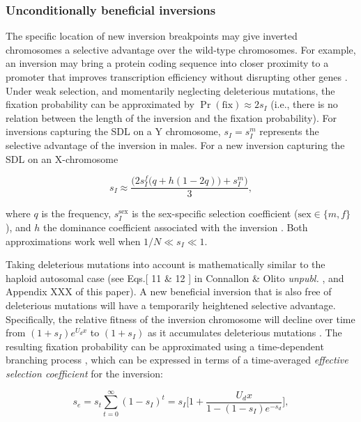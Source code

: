 \documentclass{article}
\newcommand\hl[1]{%
  \bgroup
  \hskip0pt\color{blue!80!black}%
  #1%
  \egroup
}
\begin{document}
\subsubsection*{Unconditionally beneficial inversions}

The specific location of new inversion breakpoints may give inverted chromosomes a selective advantage over the wild-type chromosomes. For example, an inversion may bring a protein coding sequence into closer proximity to a promoter that improves transcription efficiency without disrupting other genes \citep{KrimbasPowell1992}. Under weak selection, and momentarily neglecting deleterious mutations, the fixation probability can be approximated by $\Pr(\text{fix}) \approx 2 s_{I}$ \citep{Haldane1927} (i.e., there is no relation between the length of the inversion and the fixation probability). For inversions capturing the SDL on a Y chromosome, $s_I = s_{I}^{m}$ represents the selective advantage of the inversion in males. For a new inversion capturing the SDL on an X-chromosome

\begin{equation} \label{eq:benXlinkednoDel}
	s_{I} \approx \frac{\big( 2 s_{I}^{f} \big(q + h (1 - 2q) \big) + s_{I}^{m} \big)}{3},
\end{equation}

\noindent where $q$ is the frequency, $s_{I}^{\text{sex}}$ is the sex-specific selection coefficient ($\text{sex} \in \{m,f\}$), and $h$ the dominance coefficient associated with the inversion \citep{Charlesworth2010}. Both approximations work well when $1/N \ll s_I \ll 1.$

Taking deleterious mutations into account is mathematically similar to the haploid autosomal case (see Eqs.[\hl{11 \& 12}] in \hl{Connallon \& Olito {\itshape unpubl.}}, and Appendix \hl{XXX} of this paper). A new beneficial inversion that is also free of deleterious mutations will have a temporarily heightened selective advantage. Specifically, the relative fitness of the inversion chromosome will decline over time from $(1 + s_I)e^{U_d x}$ to $(1 + s_I)$ as it accumulates deleterious mutations \citep{Nei1967}. The resulting fixation probability can be approximated using a time-dependent branching process \citep{PeischlKirkpatrick2012, KirkpatrickPeischl2013}, which can be expressed in terms of a time-averaged {\itshape effective selection coefficient} for the inversion:

\begin{equation} \label{eq:benSe}
	s_{e} = s_t \sum_{t=0}^{\infty} (1 - s_I)^t = s_I \Bigg[1 + \frac{U_d x}{1 - (1-s_I)e^{-s_d}} \Bigg],
\end{equation}
\end{document}
